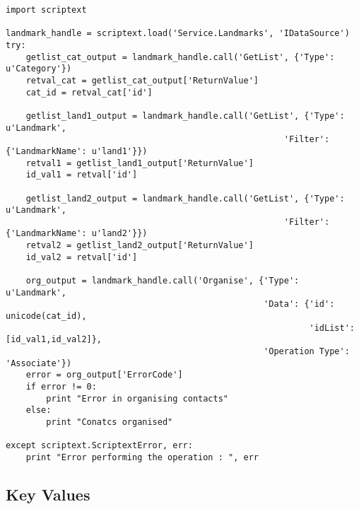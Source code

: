 \begin{verbatim}
import scriptext

landmark_handle = scriptext.load('Service.Landmarks', 'IDataSource')
try:
    getlist_cat_output = landmark_handle.call('GetList', {'Type': u'Category'})
    retval_cat = getlist_cat_output['ReturnValue']
    cat_id = retval_cat['id']

    getlist_land1_output = landmark_handle.call('GetList', {'Type': u'Landmark',  
                                                       'Filter': {'LandmarkName': u'land1'}})
    retval1 = getlist_land1_output['ReturnValue']
    id_val1 = retval['id']

    getlist_land2_output = landmark_handle.call('GetList', {'Type': u'Landmark',
                                                       'Filter': {'LandmarkName': u'land2'}})
    retval2 = getlist_land2_output['ReturnValue']
    id_val2 = retval['id']

    org_output = landmark_handle.call('Organise', {'Type': u'Landmark', 
                                                   'Data': {'id': unicode(cat_id),
                                                            'idList': [id_val1,id_val2]},
                                                   'Operation Type': 'Associate'})
    error = org_output['ErrorCode']
    if error != 0:
        print "Error in organising contacts"
    else:
        print "Conatcs organised"

except scriptext.ScriptextError, err:
    print "Error performing the operation : ", err
\end{verbatim}

\subsection{Key Values}
\label{subsec:landmarkkeyval}

